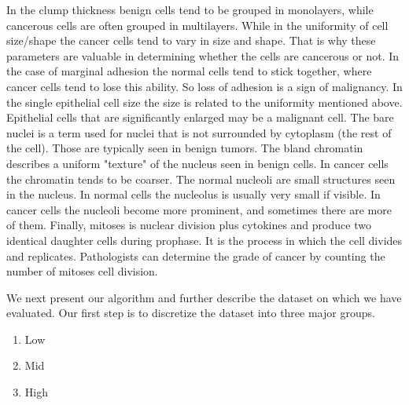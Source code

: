 \documentclass[conference]{IEEEtran}
\begin{document}
\vspace{.5 cm}
In the clump thickness benign cells tend to be grouped in monolayers, while cancerous cells are often grouped in multilayers. While in the uniformity of cell size/shape the cancer cells tend to vary in size and shape. That is why these parameters are valuable in determining whether the cells are cancerous or not. In the case of marginal adhesion the normal cells tend to stick together, where cancer cells tend to lose this ability. So loss of adhesion is a sign of malignancy. In the single epithelial cell size the size is related to the uniformity
mentioned above. Epithelial cells that are significantly enlarged may be a malignant cell. The bare nuclei is a term used for nuclei that is not surrounded by cytoplasm (the rest of the cell). Those are typically seen in benign tumors. The bland chromatin describes a uniform "texture" of the nucleus seen in benign cells. In cancer cells the chromatin tends to be coarser. The normal nucleoli are small structures seen in the nucleus. In normal cells the nucleolus is usually very small if visible. In cancer cells the nucleoli become more prominent, and sometimes there are more of them. Finally, mitoses is nuclear division plus cytokines and produce two identical daughter cells during prophase. It is the process in which the cell divides and replicates. Pathologists can determine the grade of cancer by counting the number of mitoses cell division.


We next present our algorithm and further describe the dataset on which we have evaluated. Our first step is to discretize the dataset into three major groups.

\begin{enumerate}
\item Low
\item Mid
\item High
\end{enumerate}
\end{document}
